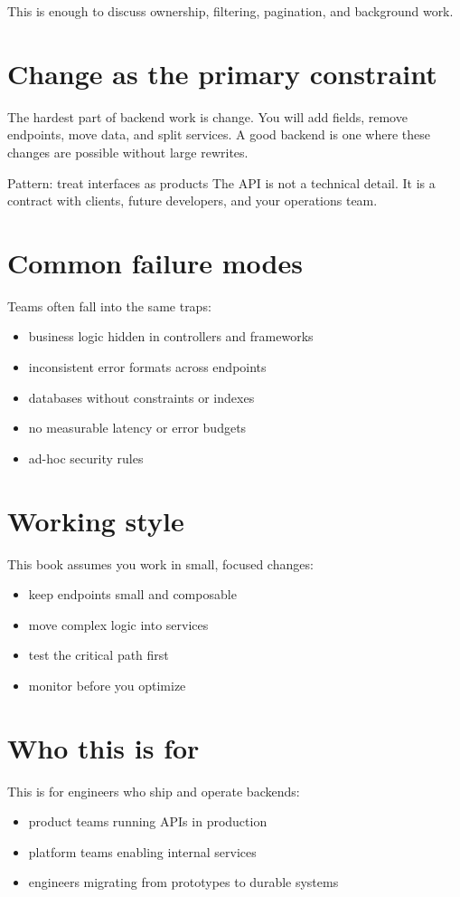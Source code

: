 This is enough to discuss ownership, filtering, pagination, and background work.

\section{Change as the primary constraint}
The hardest part of backend work is change.
You will add fields, remove endpoints, move data, and split services.
A good backend is one where these changes are possible without large rewrites.

\begin{patternbox}{Pattern: treat interfaces as products}
The API is not a technical detail.
It is a contract with clients, future developers, and your operations team.
\end{patternbox}

\section{Common failure modes}
Teams often fall into the same traps:
\begin{itemize}[nosep]
  \item business logic hidden in controllers and frameworks
  \item inconsistent error formats across endpoints
  \item databases without constraints or indexes
  \item no measurable latency or error budgets
  \item ad-hoc security rules
\end{itemize}

\section{Working style}
This book assumes you work in small, focused changes:
\begin{itemize}[nosep]
  \item keep endpoints small and composable
  \item move complex logic into services
  \item test the critical path first
  \item monitor before you optimize
\end{itemize}

\section{Who this is for}
This is for engineers who ship and operate backends:
\begin{itemize}[nosep]
  \item product teams running APIs in production
  \item platform teams enabling internal services
  \item engineers migrating from prototypes to durable systems
\end{itemize}

